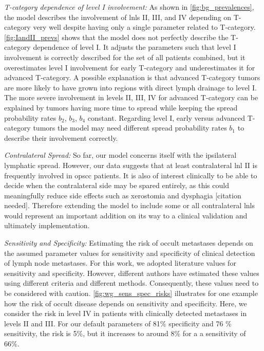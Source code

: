 \documentclass[twocolumn]{article}
\begin{document}
{\it T-category dependence of level I involvement:} As shown in \cref{fig:bg_prevalences}, the model describes the involvement of \glspl{lnl} II, III, and IV depending on T-category very well despite having only a single parameter related to T-category. \cref{fig:IandII_prevs} shows that the model does not perfectly describe the T-category dependence of level I. It adjusts the parameters such that level I involvement is correctly described for the set of all patients combined, but it overestimates level I involvement for early T-category and underestimates it for advanced T-category. A possible explanation is that advanced T-category tumors are more likely to have grown into regions with direct lymph drainage to level I. The more severe involvement in levels II, III, IV for advanced T-category can be explained by tumors having more time to spread while keeping the spread probability rates $b_2$, $b_3$, $b_4$ constant. Regarding level I, early versus advanced T-category tumors the model may need different spread probability rates $b_1$ to describe their involvement correctly.

{\it Contralateral Spread:} So far, our model concerns itself with the ipsilateral lymphatic spread. However, our data suggests that at least contralateral \gls{lnl} II is frequently involved in \gls{opscc} patients. It is also of interest clinically to be able to decide when the contralateral side may be spared entirely, as this could meaningfully reduce side effects such as xerostomia and dysphagia [citation needed]. Therefore extending the model to include some or all contralateral \glspl{lnl} would represent an important addition on its way to a clinical validation and ultimately implementation.

{\it Sensitivity and Specificity:} Estimating the risk of occult metastases depends on the assumed parameter values for sensitivity and specificity of clinical detection of lymph node metastases. For this work, we adopted literature values for sensitivity and specificity. However, different authors have estimated these values using different criteria and different methods. Consequently, these values need to be considered with caution. \cref{fig:wg_sens_spec_risks} illustrates for one example how the risk of occult disease depends on sensitivity and specificity. Here, we consider the risk in level IV in patients with clinically detected metastases in levels II and III. For our default parameters of 81\% specificity and 76 \% sensitivity, the risk is 5\%, but it increases to around 8\% for a a sensitivity of 66\%.
\end{document}
